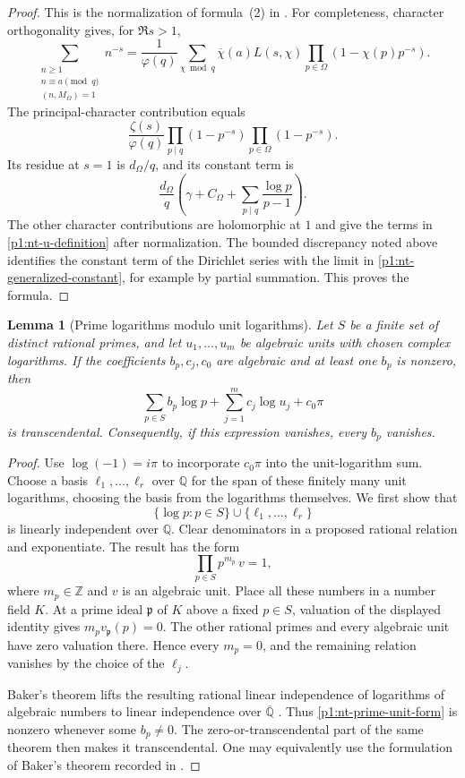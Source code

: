 \documentclass[11pt,a4paper]{article}
\newtheorem{lemma}[theorem]{Lemma}
\theoremstyle{definition}
\theoremstyle{remark}
\numberwithin{equation}{section}
\begin{document}
\begin{proof}
This is the normalization of formula~(2) in \cite{p1:GMS2016}.
For completeness, character orthogonality gives, for $\Re s>1$,
\[
 \sum_{\substack{n\ge1\\n\equiv a\pmod q\\(n,M_\Omega)=1}}n^{-s}
 =\frac1{\varphi(q)}\sum_{\chi\bmod q}
 \overline\chi(a)L(s,\chi)
 \prod_{p\in\Omega}(1-\chi(p)p^{-s}).
\]
The principal-character contribution equals
\[
 \frac{\zeta(s)}{\varphi(q)}
 \prod_{p\mid q}(1-p^{-s})\prod_{p\in\Omega}(1-p^{-s}).
\]
Its residue at $s=1$ is $d_\Omega/q$, and its constant term is
\[
 \frac{d_\Omega}{q}
 \left(\gamma+C_\Omega+
 \sum_{p\mid q}\frac{\log p}{p-1}\right).
\]
The other character contributions are holomorphic at $1$ and give the
terms in \eqref{p1:nt-u-definition} after normalization.  The bounded
discrepancy noted above identifies the constant term of the Dirichlet
series with the limit in \eqref{p1:nt-generalized-constant}, for example by
partial summation.  This proves the formula.
\end{proof}

\begin{lemma}[Prime logarithms modulo unit logarithms]
\label{p1:nt-prime-unit-separation}
Let $S$ be a finite set of distinct rational primes, and let
$u_1,\ldots,u_m$ be algebraic units with chosen complex logarithms.
If the coefficients $b_p,c_j,c_0$ are algebraic and at least one $b_p$
is nonzero, then
\begin{equation}
\label{p1:nt-prime-unit-form}
 \sum_{p\in S}b_p\log p+\sum_{j=1}^m c_j\log u_j+c_0\pi
\end{equation}
is transcendental.  Consequently, if this expression vanishes, every
$b_p$ vanishes.
\end{lemma}

\begin{proof}
Use $\log(-1)=i\pi$ to incorporate $c_0\pi$ into the unit-logarithm
sum.  Choose a basis $\ell_1,\ldots,\ell_r$ over $\mathbb Q$ for the
span of these finitely many unit logarithms, choosing the basis from the
logarithms themselves.  We first show that
\[
 \{\log p:p\in S\}\cup\{\ell_1,\ldots,\ell_r\}
\]
is linearly independent over $\mathbb Q$.
Clear denominators in a proposed rational relation and exponentiate.
The result has the form
\[
 \prod_{p\in S}p^{m_p}\,v=1,
\]
where $m_p\in\mathbb Z$ and $v$ is an algebraic unit.  Place all
these numbers in a number field $K$.  At a prime ideal $\mathfrak p$
of $K$ above a fixed $p\in S$, valuation of the displayed identity gives
$m_p v_{\mathfrak p}(p)=0$.  The other rational primes and every
algebraic unit have zero valuation there.  Hence every $m_p=0$,
and the remaining relation vanishes by the choice of the $\ell_j$.

Baker's theorem lifts the resulting rational linear independence of
logarithms of algebraic numbers to linear independence over
$\overline{\mathbb Q}$ \cite{p1:Baker1966}.  Thus
\eqref{p1:nt-prime-unit-form} is nonzero whenever some $b_p\ne0$.
The zero-or-transcendental part of the same theorem then makes it
transcendental.  One may equivalently use the formulation of Baker's
theorem recorded in \cite[Theorem~14]{p1:GMS2016}.
\end{proof}
\end{document}
